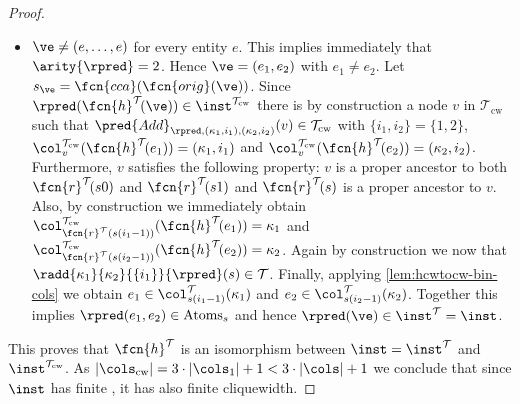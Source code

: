 \begin{proof}
\begin{itemize}
		\begin{itemize}
			\item $\fcn{r}^{\mathcal{T}}\!(s')$ is a proper ancestor of $v', v_{i}, v$,
			\item $v'$ is a proper ancestor of $v_{i}$ and $v$,
			\item $v_{i}$ is a proper ancestor of $v$,
			\item $\pred{Recolor}_{\origcol_1 \shortto (\origcol_1, i)}(v_{i})\in\mathcal{T}_{\mathrm{cw}}$,
			\item $\pred{Add}_{\rpred, (\origcol_1, i), (\origcol_1, i)}$ or $\pred{Add}_{\rpred, (\origcol_1, i)}$ depending on $\arity{\rpred} = 2$ or $\arity{\rpred} = 1$.
		\end{itemize}
		By construction we may obtain $\unradd{\origcol_2}{\rpred}^{i}(s')\in\mathcal{T}$ or  $\unradd{\origcol_1}{\rpred}^{i}(s')\in\mathcal{T}$ depending on $\arity{\rpred} = 2$ or $\arity{\rpred} = 1$. Consequently, $\rpred(\ve)\in\inst^{\mathcal{T}} = \inst$.
		\item $\ve \neq (e, \ldots, e)$ for every entity $e$. This implies immediately that $\arity{\rpred} = 2$. Hence $\ve = (e_1, e_2)$ with $e_1 \neq e_2$. Let $s_{\ve} = \fcn{cca}(\fcn{orig}(\ve))$. Since $\rpred(\fcn{h}^{\mathcal{T}}\!(\ve))\in\inst^{\mathcal{T}_{\mathrm{cw}}}$ there is by construction a node $v$ in $\mathcal{T}_{\mathrm{cw}}$ such that $\pred{Add}_{\rpred, (\kappa_1, i_1), (\kappa_2, i_2)}(v)\in\mathcal{T}_{\mathrm{cw}}$ with $\{ i_1, i_2 \} = \{ 1, 2 \}$, $ \col_{v}^{\mathcal{T}_{\mathrm{cw}}}(\fcn{h}^{\mathcal{T}}\!(e_{1})) = (\kappa_1, i_1)$ and $\col_{v}^{\mathcal{T}_{\mathrm{cw}}}(\fcn{h}^{\mathcal{T}}\!(e_{2})) = (\kappa_2, i_2)$. Furthermore, $v$ satisfies the following property: $v$ is a proper ancestor to both $\fcn{r}^{\mathcal{T}}\!(s0)$ and $\fcn{r}^{\mathcal{T}}\!(s1)$ and $\fcn{r}^{\mathcal{T}}\!(s)$ is a proper ancestor to $v$. Also, by construction we immediately obtain $ \col_{\fcn{r}^{\mathcal{T}}(s(i_1-1))}^{\mathcal{T}_{\mathrm{cw}}}(\fcn{h}^{\mathcal{T}}\!(e_{1})) = \kappa_1$ and $\col_{\fcn{r}^{\mathcal{T}}(s(i_2 - 1))}^{\mathcal{T}_{\mathrm{cw}}}(\fcn{h}^{\mathcal{T}}\!(e_{2})) = \kappa_2$. Again by construction we now that $\radd{\kappa_1}{\kappa_2}{\{i_1 \}}{\rpred}(s)\in\mathcal{T}$. Finally, applying \cref{lem:hcwtocw-bin-cols} we obtain $e_1\in\col_{s(i_1-1)}^{\mathcal{T}}(\kappa_1)$ and $e_2\in\col_{s(i_2-1)}^{\mathcal{T}}(\kappa_2)$. Together this implies $\rpred(e_1, e_2)\in\mathrm{Atoms}_{s}$ and hence $\rpred(\ve)\in\inst^{\mathcal{T}} = \inst$.
	\end{itemize}
	This proves that $\fcn{h}^{\mathcal{T}}$ is an isomorphism between $\inst = \inst^{\mathcal{T}}$ and $\inst^{\mathcal{T}_{\mathrm{cw}}}$. As $|\cols_{\mathrm{cw}}| = 3\cdot |\cols_1| + 1 < 3 \cdot |\cols| + 1$ we conclude that since $\inst$ has finite \partitionwidth{}, it has also finite cliquewidth.
\end{proof}



